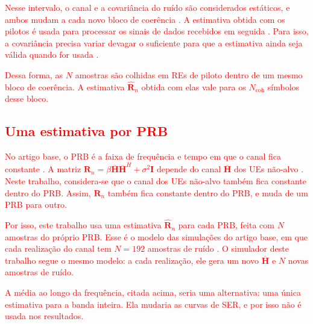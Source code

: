 \textcolor{red}{Nesse intervalo, o canal e a covariância do ruído são considerados estáticos, e ambos mudam a cada novo bloco de coerência \cite{zhao2025jsac}. A estimativa obtida com os pilotos é usada para processar os sinais de dados recebidos em seguida \cite{tomasin-interference}. Para isso, a covariância precisa variar devagar o suficiente para que a estimativa ainda seja válida quando for usada \cite{barriac-madhow}.}

\textcolor{red}{Dessa forma, as $N$ amostras são colhidas em REs de piloto dentro de um mesmo bloco de coerência. A estimativa $\hat{\mathbf{R}}_n$ obtida com elas vale para os $N_{\text{coh}}$ símbolos desse bloco.}

\subsection{\texorpdfstring{\textcolor{red}{Uma estimativa por PRB}}{Uma estimativa por PRB}}\label{subsec:estimativa-prb}

\textcolor{red}{No artigo base, o PRB é a faixa de frequência e tempo em que o canal fica constante \cite{zhao2025jsac}. A matriz $\mathbf{R}_n = \beta\overline{\mathbf{H}}\overline{\mathbf{H}}^H+\sigma^2\mathbf{I}$ depende do canal $\overline{\mathbf{H}}$ dos UEs não-alvo \cite{zhao2025jsac}. Neste trabalho, considera-se que o canal dos UEs não-alvo também fica constante dentro do PRB. Assim, $\mathbf{R}_n$ também fica constante dentro do PRB, e muda de um PRB para outro.}

\textcolor{red}{Por isso, este trabalho usa uma estimativa $\hat{\mathbf{R}}_n$ para cada PRB, feita com $N$ amostras do próprio PRB. Esse é o modelo das simulações do artigo base, em que cada realização do canal tem $N = 192$ amostras de ruído \cite{zhao2025jsac}. O simulador deste trabalho segue o mesmo modelo: a cada realização, ele gera um novo $\overline{\mathbf{H}}$ e $N$ novas amostras de ruído.}

\textcolor{red}{A média ao longo da frequência, citada acima, seria uma alternativa: uma única estimativa para a banda inteira. Ela mudaria as curvas de SER, e por isso não é usada nos resultados.}

